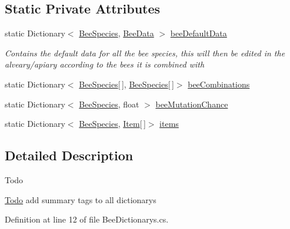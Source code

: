 \subsection*{Static Private Attributes}
\begin{DoxyCompactItemize}
\item 
static Dictionary$<$ \hyperlink{namespace_bee_game_1_1_enums_aa2ead984825678d83c42d48f6382619c}{Bee\+Species}, \hyperlink{struct_bee_game_1_1_bee_1_1_bee_data}{Bee\+Data} $>$ \hyperlink{class_bee_game_1_1_core_1_1_bee_dictionarys_a4bd3dbe3fc155e206801656c07212a96}{bee\+Default\+Data}
\begin{DoxyCompactList}\small\item\em Contains the default data for all the bee species, this will then be edited in the alveary/apiary according to the bees it is combined with \end{DoxyCompactList}\item 
static Dictionary$<$ \hyperlink{namespace_bee_game_1_1_enums_aa2ead984825678d83c42d48f6382619c}{Bee\+Species}\mbox{[}$\,$\mbox{]}, \hyperlink{namespace_bee_game_1_1_enums_aa2ead984825678d83c42d48f6382619c}{Bee\+Species}\mbox{[}$\,$\mbox{]}$>$ \hyperlink{class_bee_game_1_1_core_1_1_bee_dictionarys_a1ebc1dfba158d134ff8b28082c9a2cb2}{bee\+Combinations}
\item 
static Dictionary$<$ \hyperlink{namespace_bee_game_1_1_enums_aa2ead984825678d83c42d48f6382619c}{Bee\+Species}, float $>$ \hyperlink{class_bee_game_1_1_core_1_1_bee_dictionarys_a8928aea7b0d5b04fbf7b5055a9921385}{bee\+Mutation\+Chance}
\item 
static Dictionary$<$ \hyperlink{namespace_bee_game_1_1_enums_aa2ead984825678d83c42d48f6382619c}{Bee\+Species}, \hyperlink{struct_bee_game_1_1_items_1_1_item}{Item}\mbox{[}$\,$\mbox{]}$>$ \hyperlink{class_bee_game_1_1_core_1_1_bee_dictionarys_a08901f100e7fa17a7a441b32ec680146}{items}
\end{DoxyCompactItemize}


\subsection{Detailed Description}


\begin{DoxyRefDesc}{Todo}
\item[\hyperlink{todo__todo000004}{Todo}]add summary tags to all dictionarys \end{DoxyRefDesc}


Definition at line 12 of file Bee\+Dictionarys.\+cs.



